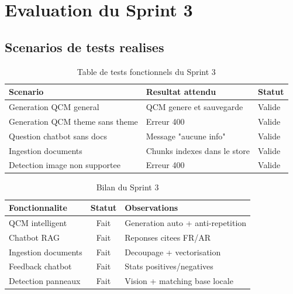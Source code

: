 \documentclass[a4paper,12pt]{report}
\begin{document}
\section{Evaluation du Sprint 3}

\subsection{Scenarios de tests realises}

\begin{table}[H]
  \centering
  \caption{Table de tests fonctionnels du Sprint 3}
  \label{tab:tests_s3}
  \begin{tabular}{|p{5.2cm}|p{3.2cm}|p{5.4cm}|}
    \hline
    \textbf{Scenario} & \textbf{Resultat attendu} & \textbf{Statut} \\
    \hline
    Generation QCM general & QCM genere et sauvegarde & Valide \\
    \hline
    Generation QCM theme sans theme & Erreur 400 & Valide \\
    \hline
    Question chatbot sans docs & Message "aucune info" & Valide \\
    \hline
    Ingestion documents & Chunks indexes dans le store & Valide \\
    \hline
    Detection image non supportee & Erreur 400 & Valide \\
    \hline
  \end{tabular}
\end{table}

\begin{table}[H]
  \centering
  \caption{Bilan du Sprint 3}
  \label{tab:bilan_s3}
  \begin{tabular}{|p{5cm}|c|p{6.5cm}|}
    \hline
    \textbf{Fonctionnalite} & \textbf{Statut} & \textbf{Observations} \\
    \hline
    QCM intelligent & Fait & Generation auto + anti-repetition \\
    \hline
    Chatbot RAG & Fait & Reponses citees FR/AR \\
    \hline
    Ingestion documents & Fait & Decoupage + vectorisation \\
    \hline
    Feedback chatbot & Fait & Stats positives/negatives \\
    \hline
    Detection panneaux & Fait & Vision + matching base locale \\
    \hline
  \end{tabular}
\end{table}
\end{document}
